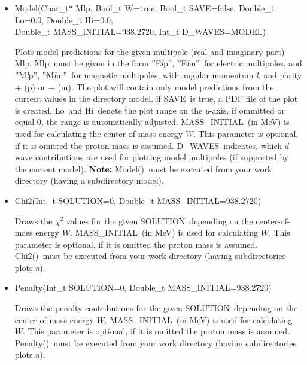 \documentclass[a4paper,10pt]{article}
\def\tt{\ttfamily}
\def\rm{\rmfamily}
\begin{document}
\begin{itemize}
\item
\tt Model(Char\_t* Mlp, Bool\_t W=true, Bool\_t SAVE=false, Double\_t Lo=0.0, Double\_t Hi=0.0,\\
\phantom{Model(}Double\_t MASS\_INITIAL=938.2720, Int\_t D\_WAVES=MODEL)\rm

Plots model predictions for the given multipole (real and imaginary part) \tt Mlp\rm.
\tt Mlp\rm\ must be given in the form \tt ''E\textit{l}p''\rm,
\tt ''E\textit{l}m''\rm\ 
for electric multipoles, and
\tt ''M\textit{l}p''\rm,
\tt ''M\textit{l}m''\rm\ 
for magnetic multipoles, with angular momentum \tt\textit{l}\rm, and parity
$+$ (\tt p\rm) or $-$ (\tt m\rm). The plot will contain only model predictions from the current
values in the directory \tt model\rm.
if \tt SAVE\rm\ is true, a PDF file of the plot is created. \tt Lo\rm\ and \tt Hi\rm\ denote the plot range on the $y$-axis, 
if ommitted or equal 0, the range is automatically adjusted.
\tt MASS\_INITIAL\rm\ (in MeV) is used for calculating the center-of-mass energy $W$. This parameter 
is optional, if it is omitted the proton mass is assumed.
\tt D\_WAVES\rm\ indicates, which $d$ wave contributions are used for plotting model multipoles (if supported by the current model).
\textbf{Note:}  \tt Model()\rm\ must be executed from your
work directory (having a subdirectory \tt model\rm).


\item
\tt Chi2(Int\_t SOLUTION=0, Double\_t MASS\_INITIAL=938.2720)\rm

Draws the $\chi^2$ values for the given \tt SOLUTION\rm\ depending on the center-of-mass energy $W$.
\tt MASS\_INITIAL\rm\ (in MeV) is used for calculating $W$. This parameter 
is optional, if it is omitted the proton mass is assumed.
\tt Chi2()\rm\ must be executed from your
work directory (having subdirectories \tt plots.\textit{n}\rm).

\item
\tt Penalty(Int\_t SOLUTION=0, Double\_t MASS\_INITIAL=938.2720)\rm

Draws the penalty contributions for the given \tt SOLUTION\rm\ depending on the center-of-mass energy $W$.
\tt MASS\_INITIAL\rm\ (in MeV) is used for calculating $W$. This parameter 
is optional, if it is omitted the proton mass is assumed.
\tt Penalty()\rm\ must be executed from your
work directory (having subdirectories \tt plots.\textit{n}\rm).
\end{itemize}
\end{document}
